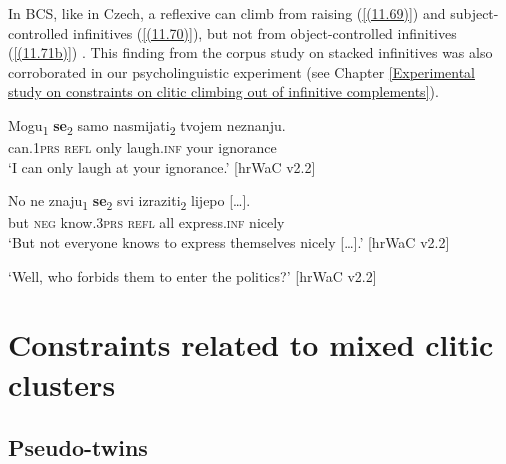 \noindent In BCS, like in Czech, a reflexive can climb from raising (\ref{(11.69)}) and subject-controlled infinitives (\ref{(11.70)}), but not from object-controlled infinitives (\ref{(11.71b)}) \citep*[cf.][]{HKJ18}. This finding from the corpus study on stacked infinitives was also corroborated in our psycholinguistic experiment (see Chapter \ref{Experimental study on constraints on clitic climbing out of infinitive complements}).

\begin{exe}\ex\label{(11.69)}
\gll Mogu\textsubscript{1} \textbf{se}\textsubscript{2} samo nasmijati\textsubscript{2} tvojem neznanju. \\
can.1\textsc{prs} \textsc{refl} only laugh.\textsc{inf} your ignorance \\
\glt ‘I can only laugh at your ignorance.’
\hfill [hrWaC v2.2]

\ex\label{(11.70)}
\gll No ne znaju\textsubscript{1} \textbf{se}\textsubscript{2} svi izraziti\textsubscript{2} {lijepo [\dots].} \\
but \textsc{neg} know.3\textsc{prs} \textsc{refl} all express.\textsc{inf} nicely \\
\glt ‘But not everyone knows to express themselves nicely [\dots].’
\hfill [hrWaC v2.2]

\ex
\begin{xlist}
\end{xlist}
\glt ‘Well, who forbids them to enter the politics?’
\hfill [hrWaC v2.2]
\end{exe}

\section{Constraints related to mixed clitic clusters}
\label{Constraints related to mixed clitic clusters}
\subsection{Pseudo-twins}
\label{Pseudo-twins}

